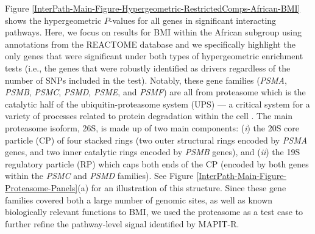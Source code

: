 \documentclass[10pt,a4paper]{article}
\begin{document}
Figure \ref{InterPath-Main-Figure-Hypergeometric-RestrictedComps-African-BMI} shows the hypergeometric $P$-values for all genes in significant interacting pathways. Here, we focus on results for BMI within the African subgroup using annotations from the REACTOME database and we specifically highlight the only genes that were significant under both types of hypergeometric enrichment tests (i.e., the genes that were robustly identified as drivers regardless of the number of SNPs included in the test). Notably, these gene families (\textit{PSMA}, \textit{PSMB}, \textit{PSMC}, \textit{PSMD}, \textit{PSME}, and \textit{PSMF}) are all from proteasome which is the catalytic half of the ubiquitin-proteasome system (UPS) --- a critical system for a variety of processes related to protein degradation within the cell \cite{Voges1999,Livneh2016,Collins2017}. The main proteasome isoform, 26S, is made up of two main components: (\textit{i}) the 20S core particle (CP) of four stacked rings (two outer structural rings encoded by \textit{PSMA} genes, and two inner catalytic rings encoded by \textit{PSMB} genes), and (\textit{ii}) the 19S regulatory particle (RP) which caps both ends of the CP (encoded by both genes within the \textit{PSMC} and \textit{PSMD} families). See Figure \ref{InterPath-Main-Figure-Proteasome-Panels}(a) for an illustration of this structure. Since these gene families covered both a large number of genomic sites, as well as known biologically relevant functions to BMI, we used the proteasome as a test case to further refine the pathway-level signal identified by MAPIT-R.
 
\end{document}
